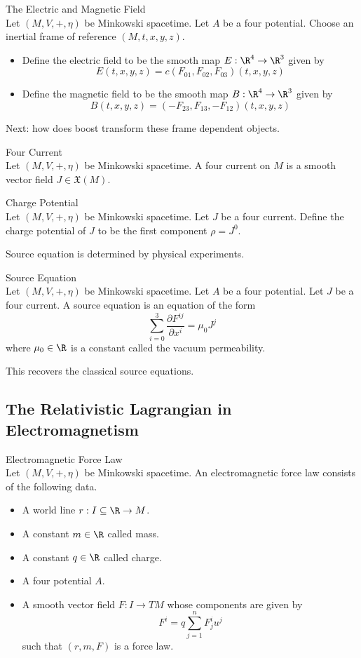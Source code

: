 \documentclass[a4paper]{article}
\begin{document}
\begin{defn}{The Electric and Magnetic Field}{}\\
Let $(M,V,+,\eta)$ be Minkowski spacetime. Let $A$ be a four potential. Choose an inertial frame of reference $(M,t,x,y,z)$. 
\begin{itemize}
\item Define the electric field to be the smooth map $E:\R^4\to\R^3$ given by $$E(t,x,y,z)=c(F_{01},F_{02},F_{03})(t,x,y,z)$$
\item Define the magnetic field to be the smooth map $B:\R^4\to\R^3$ given by $$B(t,x,y,z)=(-F_{23},F_{13},-F_{12})(t,x,y,z)$$
\end{itemize}
\end{defn}

Next: how does boost transform these frame dependent objects. 

\begin{defn}{Four Current}{}\\
Let $(M,V,+,\eta)$ be Minkowski spacetime. A four current on $M$ is a smooth vector field $J\in\mathfrak{X}(M)$. 
\end{defn}

\begin{defn}{Charge Potential}{}\\
Let $(M,V,+,\eta)$ be Minkowski spacetime. Let $J$ be a four current. Define the charge potential of $J$ to be the first component $\rho=J^0$. 
\end{defn}

Source equation is determined by physical experiments. 

\begin{defn}{Source Equation}{}\\
Let $(M,V,+,\eta)$ be Minkowski spacetime. Let $A$ be a four potential. Let $J$ be a four current. A source equation is an equation of the form $$\sum_{i=0}^3\frac{\partial F^{ij}}{\partial x^i}=\mu_0J^j$$ where $\mu_0\in\R$ is a constant called the vacuum permeability. 
\end{defn}

This recovers the classical source equations. 

\subsection{The Relativistic Lagrangian in Electromagnetism}
\begin{defn}{Electromagnetic Force Law}{}\\
Let $(M,V,+,\eta)$ be Minkowski spacetime. An electromagnetic force law consists of the following data. 
\begin{itemize}
\item A world line $r:I\subseteq\R\to M$. 
\item A constant $m\in\R$ called mass. 
\item A constant $q\in\R$ called charge. 
\item A four potential $A$. 
\item A smooth vector field $F:I\to TM$ whose components are given by $$F^i=q\sum_{j=1}^nF_j^iu^j$$ such that $(r,m,F)$ is a force law. 
\end{itemize}
\end{defn}
\end{document}
